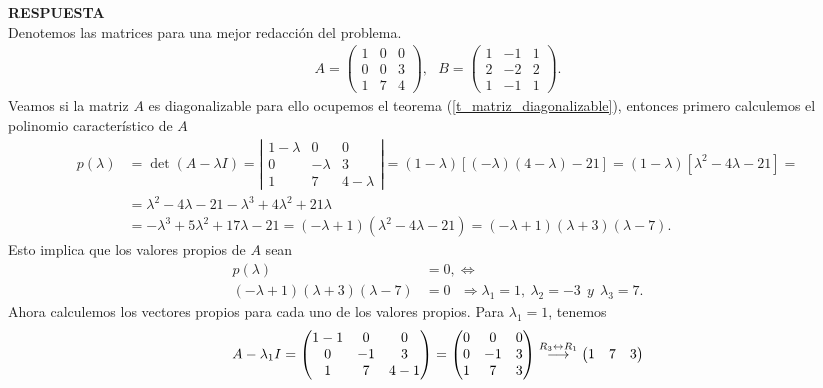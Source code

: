 \documentclass[11pt,letterpaper]{article}
\newcommand{\res}{\textbf{RESPUESTA}\\}
\newcommand{\grstep}[2][\relax]{%
   \ensuremath{\mathrel{
       {\mathop{\longrightarrow}\limits^{#2\mathstrut}_{
                                     \begin{subarray}{l} #1 \end{subarray}}}}}}
\begin{document}
\begin{enumerate}
\res Denotemos las matrices para una mejor redacción del problema.
\begin{align*}
A=\begin{pmatrix}
1 & 0 & 0\\
0 & 0 & 3\\
1 & 7 & 4
\end{pmatrix}, \ \ \ B=\begin{pmatrix}
1 &-1 & 1\\
2 &-2 & 2\\
1 &-1 & 1
\end{pmatrix}.
\end{align*}
Veamos si la matriz $A$ es diagonalizable para ello ocupemos el teorema (\ref{t_matriz_diagonalizable}), entonces primero calculemos el polinomio característico de $A$
\begin{align*}
p(\lambda) &= \det (A-\lambda I)=\left|\begin{array}{ccc}
1-\lambda &0 & 0 \\
0& -\lambda & 3\\
1 & 7 & 4-\lambda
\end{array} \right|=(1-\lambda)[(-\lambda)(4-\lambda)-21]= (1-\lambda)[\lambda^2-4\lambda-21]= \\
&=\lambda^2-4\lambda-21-\lambda^3+4\lambda^2+21\lambda\\
&=-\lambda^3+5\lambda^2+17\lambda-21=(-\lambda+1)(\lambda^2-4\lambda-21)=(-\lambda+1)(\lambda+3)(\lambda-7).
\end{align*}
Esto implica que los valores propios de $A$ sean
\begin{align*}
p(\lambda)&=0,\Leftrightarrow\\
(-\lambda+1)(\lambda+3)(\lambda-7)&=0\ \ \ \Rightarrow \lambda_1=1, \ \lambda_2=-3 \ \ y \ \ \lambda_3=7.
\end{align*}
Ahora calculemos los vectores propios para cada uno de los valores propios. Para $\lambda_1=1$, tenemos 
\begin{align*}
A-\lambda_1I=\begin{pmatrix}
1-1& 0 & 0\\
0 & -1 &3\\
1 & 7 & 4-1
\end{pmatrix}=\begin{pmatrix}
0& 0 & 0\\
0 & -1 &3\\
1 & 7 & 3
\end{pmatrix}%
\grstep[]{R_3 \leftrightarrow R_1}
%
\begin{pmatrix}
1 & 7 & 3\\

\end{pmatrix}
\end{align*}
\end{enumerate}
\end{document}
